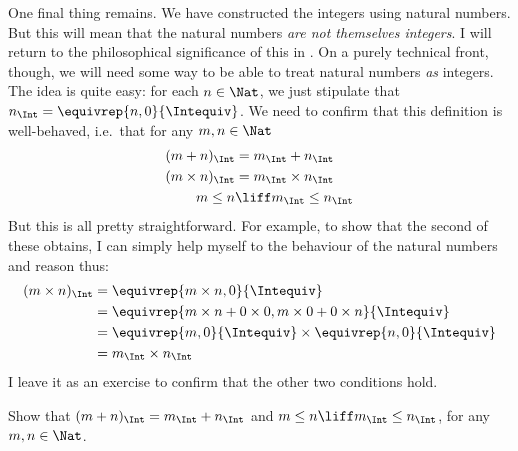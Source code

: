 \documentclass[../../../include/open-logic-section]{subfiles}
\begin{document}
One final thing remains. We have constructed the integers using natural numbers. But this will mean that the natural numbers \emph{are not themselves integers}. I will return to the philosophical significance of this in . On a purely technical front, though, we will need some way to be able to treat natural numbers \emph{as} integers. The idea is quite easy: for each $n \in \Nat$, we just stipulate that $n_\Int = \equivrep{n, 0}{\Intequiv}$. We need to confirm that this definition is well-behaved, i.e.\ that for any $m, n \in \Nat$
\begin{align*}
	(m + n)_\Int &= m_\Int + n_\Int\\
	(m \times n)_\Int &= m_\Int \times n_\Int\\
	m \leq n &\liff m_\Int \leq n_\Int
\end{align*}
But this is all pretty straightforward. For example, to show that the second of these obtains, I can simply help myself to the behaviour of the natural numbers and reason thus:
	\begin{align*}
		(m \times n)_\Int  &= \equivrep{m \times n, 0}{\Intequiv} \\
		&= \equivrep{m \times n + 0 \times 0, m \times 0 + 0 \times n}{\Intequiv} \\
		&= \equivrep{m, 0}{\Intequiv} \times \equivrep{n, 0}{\Intequiv} \\
		&= m_\Int \times n_\Int
	\end{align*}
I leave it as an exercise to confirm that the other two conditions hold.
\begin{prob}
	Show that $(m + n)_\Int = m_\Int + n_\Int$ and $m \leq n \liff m_\Int \leq n_\Int$, for any $m, n \in \Nat$.
\end{prob}
\end{document}
